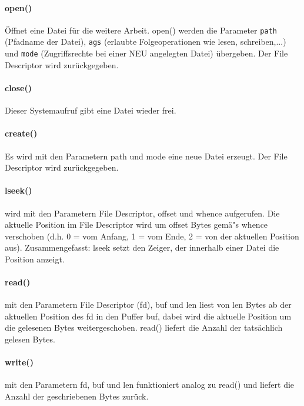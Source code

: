 \begin{answer}
  \paragraph{open()}
  Öffnet eine Datei für die weitere Arbeit. open() werden die Parameter \texttt{path} (Pfadname der Datei),
  \texttt{ags} (erlaubte Folgeoperationen wie lesen, schreiben,...) und \texttt{mode} (Zugriffsrechte bei einer NEU
  angelegten Datei) übergeben. Der File Descriptor wird zurückgegeben.
  \\

  \paragraph{close()}
  Dieser Systemaufruf gibt eine Datei wieder frei.
  \\

  \paragraph{create()}
  Es wird mit den Parametern path und mode eine neue Datei erzeugt. Der File Descriptor wird
  zurückgegeben.
  \\

  \paragraph{lseek()}
  wird mit den Parametern File Descriptor, offset und whence aufgerufen. Die aktuelle Position im
  File Descriptor wird um offset Bytes gemä"s whence verschoben (d.h. 0 = vom Anfang, 1 = vom
  Ende, 2 = von der aktuellen Position aus).
  Zusammengefasst: lseek setzt den Zeiger, der innerhalb einer Datei die Position anzeigt.
  \\

  \paragraph{read()}
  mit den Parametern File Descriptor (fd), buf und len liest von len Bytes ab der aktuellen Position
  des fd in den Puffer buf, dabei wird die aktuelle Position um die gelesenen Bytes weitergeschoben.
  read() liefert die Anzahl der tatsächlich gelesen Bytes.
  \\

  \paragraph{write()}
  mit den Parametern fd, buf und len funktioniert analog zu read() und liefert die Anzahl der geschriebenen
  Bytes zurück.
\end{answer}

